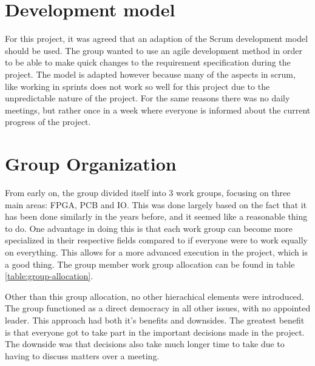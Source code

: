 \section{Development model}
For this project, it was agreed that an adaption of the Scrum development model should be used. The group wanted
to use an agile development method in order to be able to make quick changes to the requirement specification during the project.
The model is adapted however because many of the aspects in scrum, like working in sprints does not work so well for this project due to the unpredictable nature of the project. 
For the same reasons there was no daily meetings, but rather once in a week where everyone is informed about the current progress of the project.
\section{Group Organization}

From early on, the group divided itself into 3 work groups, focusing on three main areas: FPGA, PCB and IO.
This was done largely based on the fact that it has been done similarly in the years before\cn, and it seemed like a reasonable thing to do.
One advantage in doing this is that each work group can become more specialized in their respective fields compared to if everyone were to work equally on everything.
This allows for a more advanced execution in the project, which is a good thing.
The group member work group allocation can be found in table \vref{table:group-allocation}.

Other than this group allocation, no other hierachical elements were introduced.
The group functioned as a direct democracy in all other issues, with no appointed leader. This approach had both
it's benefits and downsides. The greatest benefit is that everyone got to take part in the important decisions made in the project.
The downside was that decisions also take much longer time to take due to having to discuss matters over a meeting.


